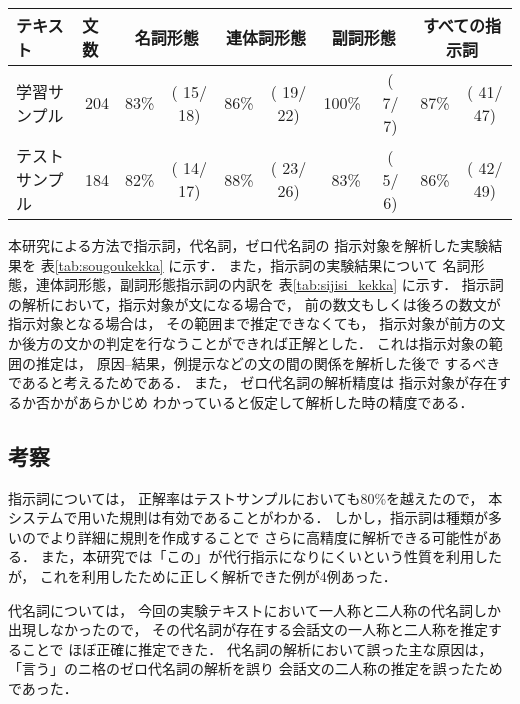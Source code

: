 \begin{table*}[t]
  \begin{center}
    \caption{指示詞の実験結果の内訳}
    \label{tab:sijisi_kekka}
\begin{tabular}[c]{|l|r|r@{}c|r@{}c|r@{}c|r@{}c|}\hline
\multicolumn{1}{|p{2cm}|}{テキスト}&\multicolumn{1}{|l|}{文数}&
\multicolumn{2}{c|}{名詞形態}&
\multicolumn{2}{c|}{連体詞形態}&
\multicolumn{2}{c|}{副詞形態}&
\multicolumn{2}{c|}{すべての指示詞}\\\hline
学習サンプル                 &204 &  83\% &  ( 15/ 18)  &  86\% &   ( 19/ 22)   & 100\% & ( 7/ 7) &  87\% & ( 41/ 47) \\\hline
テストサンプル               &184 &  82\% &  ( 14/ 17)  &  88\% &   ( 23/ 26)   &  83\% & ( 5/ 6) &  86\% & ( 42/ 49) \\\hline
\end{tabular}
\end{center}
\end{table*}

本研究による方法で指示詞，代名詞，ゼロ代名詞の
指示対象を解析した実験結果を
表\ref{tab:sougoukekka} に示す．
また，指示詞の実験結果について
名詞形態，連体詞形態，副詞形態指示詞の内訳を
表\ref{tab:sijisi_kekka} に示す．
指示詞の解析において，指示対象が文になる場合で，
前の数文もしくは後ろの数文が指示対象となる場合は，
その範囲まで推定できなくても，
指示対象が前方の文か後方の文かの判定を行なうことができれば正解とした．
これは指示対象の範囲の推定は，
原因--結果，例提示などの文の間の関係を解析した後で
するべきであると考えるためである．
また，
ゼロ代名詞の解析精度は
指示対象が存在するか否かがあらかじめ
わかっていると仮定して解析した時の精度である．

\subsection{考察}


指示詞については，
正解率はテストサンプルにおいても80\%を越えたので，
本システムで用いた規則は有効であることがわかる．
しかし，指示詞は種類が多いのでより詳細に規則を作成することで
さらに高精度に解析できる可能性がある．
また，本研究では「この」が代行指示になりにくいという性質を利用したが，
これを利用したために正しく解析できた例が4例あった．

代名詞については，
今回の実験テキストにおいて一人称と二人称の代名詞しか出現しなかったので，
その代名詞が存在する会話文の一人称と二人称を推定することで
ほぼ正確に推定できた．
代名詞の解析において誤った主な原因は，
「言う」のニ格のゼロ代名詞の解析を誤り
会話文の二人称の推定を誤ったためであった．

